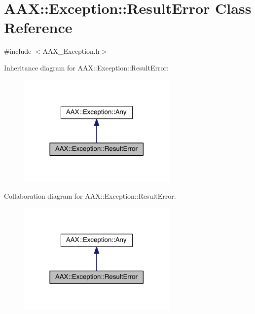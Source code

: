 \hypertarget{a00147}{}\section{A\+A\+X\+:\+:Exception\+:\+:Result\+Error Class Reference}
\label{a00147}


{\ttfamily \#include $<$A\+A\+X\+\_\+\+Exception.\+h$>$}



Inheritance diagram for A\+A\+X\+:\+:Exception\+:\+:Result\+Error\+:
\nopagebreak
\begin{figure}[H]
\begin{center}
\leavevmode
\includegraphics[width=222pt]{a00733}
\end{center}
\end{figure}


Collaboration diagram for A\+A\+X\+:\+:Exception\+:\+:Result\+Error\+:
\nopagebreak
\begin{figure}[H]
\begin{center}
\leavevmode
\includegraphics[width=222pt]{a00734}
\end{center}
\end{figure}


